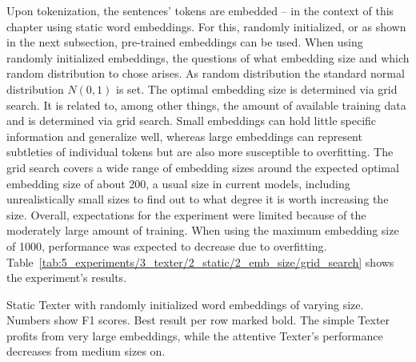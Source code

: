 Upon tokenization, the sentences' tokens are embedded -- in the context of this chapter using static word embeddings. For this, randomly initialized, or as shown in the next subsection, pre-trained embeddings can be used. When using randomly initialized embeddings, the questions of what embedding size and which random distribution to chose arises. As random distribution the standard normal distribution $N(0, 1)$ is set. The optimal embedding size is determined via grid search. It is related to, among other things, the amount of available training data and is determined via grid search. Small embeddings can hold little specific information and generalize well, whereas large embeddings can represent subtleties of individual tokens but are also more susceptible to overfitting. The grid search covers a wide range of embedding sizes around the expected optimal embedding size of about 200, a usual size in current models, including unrealistically small sizes to find out to what degree it is worth increasing the size. Overall, expectations for the experiment were limited because of the moderately large amount of training. When using the maximum embedding size of 1000, performance was expected to decrease due to overfitting. Table~\ref{tab:5_experiments/3_texter/2_static/2_emb_size/grid_search} shows the experiment's results.

\begin{table}[t]
    \centering
    
    \caption{Static Texter with randomly initialized word embeddings of varying size. Numbers show F1 scores. Best result per row marked bold. The simple Texter profits from very large embeddings, while the attentive Texter's performance decreases from medium sizes on.}
    \label{tab:5_experiments/3_texter/2_static/2_emb_size/grid_search}
\end{table}

